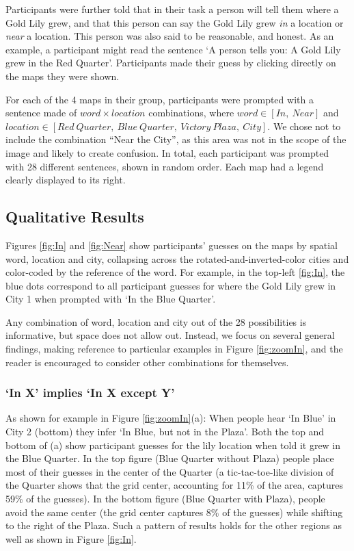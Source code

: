 \documentclass[10pt,letterpaper]{article}
\begin{document}
Participants were further told that in their task a person will tell them where a Gold Lily grew, and that this person can say the Gold Lily grew \textit{in} a location or \textit{near} a location. This person was also said to be reasonable, and honest. As an example, a participant might read the sentence `A person tells you: A Gold Lily grew in the Red Quarter'. Participants made their guess by clicking directly on the maps they were shown.

For each of the 4 maps in their group, participants were prompted with a sentence made of $word \times location$ combinations, where $word \in [In,\ Near]$ and $location \in [Red\ Quarter,\ Blue\ Quarter,\ Victory\ Plaza,\ City]$. We chose not to include the combination ``Near the City'', as this area was not in the scope of the image and likely to create confusion. In total, each participant was prompted with 28 different sentences, shown in random order. Each map had a legend clearly displayed to its right. 

\subsection{Qualitative Results} 

Figures \ref{fig:In} and \ref{fig:Near} show participants' guesses on the maps by spatial word, location and city, collapsing across the rotated-and-inverted-color cities and color-coded by the reference of the word. For example, in the top-left \ref{fig:In}, the blue dots correspond to all participant guesses for where the Gold Lily grew in City 1 when prompted with `In the Blue Quarter'. 

Any combination of word, location and city out of the 28 possibilities is informative, but space does not allow out. Instead, we focus on several general findings, making reference to particular examples in Figure \ref{fig:zoomIn}, and the reader is encouraged to consider other combinations for themselves.

\subsubsection{`In X' implies `In X except Y'} As shown for example in Figure \ref{fig:zoomIn}(a): When people hear `In Blue' in City 2 (bottom) they infer `In Blue, but not in the Plaza'. Both the top and bottom of (a) show participant guesses for the lily location when told it grew in the Blue Quarter. In the top figure (Blue Quarter without Plaza) people place most of their guesses in the center of the Quarter (a tic-tac-toe-like division of the Quarter shows that the grid center, accounting for 11\% of the area, captures 59\% of the guesses). In the bottom figure (Blue Quarter with Plaza), people avoid the same center (the grid center captures 8\% of the guesses) while shifting to the right of the Plaza. Such a pattern of results holds for the other regions as well as shown in Figure \ref{fig:In}. 
\end{document}
